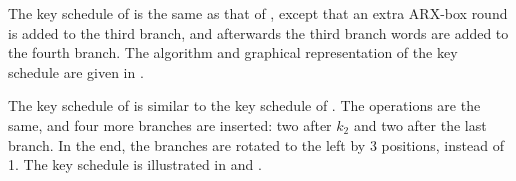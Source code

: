 
The key schedule of  is the same as that of , except that an extra ARX-box round is added to the third branch, and afterwards the third branch words are added to the fourth branch. The algorithm and graphical representation of the key schedule are given in .


The key schedule of  is similar to the key schedule of . The operations are the same, and four more branches are inserted: two after $k_2$ and two after the last branch. In the end, the branches are rotated to the left by 3 positions, instead of 1. The key schedule is illustrated in  and .

